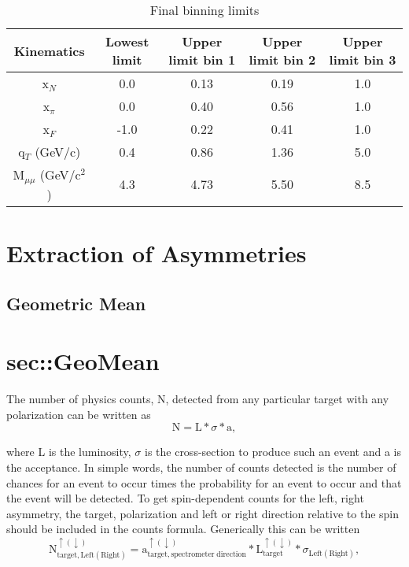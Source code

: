\begin{table}[h!t]
  \centering
  \begin{tabular}{ |c|c|c|c|c| }
    \hline \textbf{Kinematics}& \textbf{Lowest limit}& \textbf{Upper limit bin
      1}& \textbf{Upper limit bin 2}& \textbf{Upper limit bin 3}\\ \hline
    
    x$_N$& 0.0& 0.13& 0.19& 1.0\\ \hline x$_{\pi}$& 0.0& 0.40& 0.56&
    1.0\\ \hline x$_F$& -1.0& 0.22& 0.41& 1.0\\ \hline q$_T$ (GeV/c)& 0.4& 0.86&
    1.36& 5.0\\ \hline M$_{\mu\mu}$ (GeV/c$^2$)& 4.3& 4.73& 5.50& 8.5 \\ \hline
    
  \end{tabular}
  \caption{Final binning limits}
  \label{tab::binning}
\end{table}


\section{Extraction of Asymmetries} 

\subsection{Geometric Mean} \section{sec::GeoMean}
The number of physics counts, N, detected from any particular target with any
polarization can be written as
\begin{equation}
\mathrm{N} = \mathrm{L} * \sigma * \mathrm{a},
\end{equation}

\noindent
where L is the luminosity, $\sigma$ is the cross-section to produce such an
event and a is the acceptance.  In simple words, the number of counts detected
is the number of chances for an event to occur times the probability for an
event to occur and that the event will be detected.  To get spin-dependent
counts for the left, right asymmetry, the target, polarization and left or right
direction relative to the spin should be included in the counts formula.
Generically this can be written
\begin{equation}
  \label{eqn::indexedCount}
\mathrm{N}^{\uparrow(\downarrow)}_{\mathrm{target},\mathrm{Left(Right)}} =
\mathrm{a}^{\uparrow(\downarrow)}_{\mathrm{target},\mathrm{spectrometer \;
    direction}} * \mathrm{L}^{\uparrow(\downarrow)}_{\mathrm{target}} *
\sigma_{\mathrm{Left(Right)}},
\end{equation}


